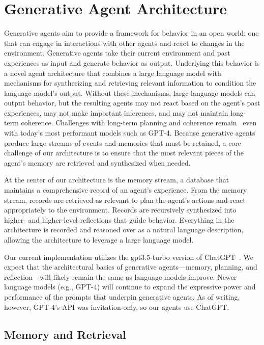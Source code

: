 \section{Generative Agent Architecture}\label{sec:architecture}
Generative agents aim to provide a framework for behavior in an open world: one that can engage in interactions with other agents and react to changes in the environment. Generative agents take their current environment and past experiences as input and generate behavior as output. Underlying this behavior is a novel agent architecture that combines a large language model with mechanisms for synthesizing and retrieving relevant information to condition the language model's output. Without these mechanisms, large language models can output behavior, but the resulting agents may not react based on the agent's past experiences, may not make important inferences, and may not maintain long-term coherence. Challenges with long-term planning and coherence remain~\cite{bubeck2023sparks} even with today's most performant models such as GPT-4. Because generative agents produce large streams of events and memories that must be retained, a core challenge of our architecture is to ensure that the most relevant pieces of the agent's memory are retrieved and synthesized when needed.

At the center of our architecture is the memory stream, a database that maintains a comprehensive record of an agent's experience. From the memory stream, records are retrieved as relevant to plan the agent's actions and react appropriately to the environment. Records are recursively synthesized into higher- and higher-level reflections that guide behavior. Everything in the architecture is recorded and reasoned over as a natural language description, allowing the architecture to leverage a large language model.

Our current implementation utilizes the gpt3.5-turbo version of ChatGPT~\cite{openai_chatgpt}. We expect that the architectural basics of generative agents---memory, planning, and reflection---will likely remain the same as language models improve. Newer language models (e.g., GPT-4) will continue to expand the expressive power and performance of the prompts that underpin generative agents. As of writing, however, GPT-4's API was invitation-only, so our agents use ChatGPT.



\subsection{Memory and Retrieval}

